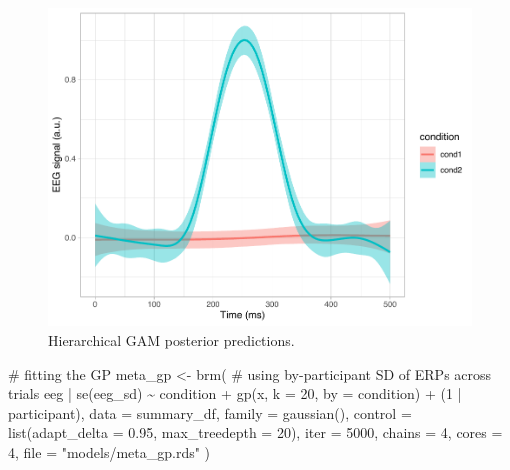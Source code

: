 \documentclass[
  doc,
  floatsintext,
  longtable,
  a4paper,
  nolmodern,
  notxfonts,
  notimes,
  colorlinks=true,linkcolor=blue,citecolor=blue,urlcolor=blue]{apa7}
\newenvironment{Shaded}{\begin{snugshade}}{\end{snugshade}}
\newcommand{\AttributeTok}[1]{\textcolor[rgb]{0.40,0.45,0.13}{#1}}
\newcommand{\CommentTok}[1]{\textcolor[rgb]{0.37,0.37,0.37}{#1}}
\newcommand{\DecValTok}[1]{\textcolor[rgb]{0.68,0.00,0.00}{#1}}
\newcommand{\FloatTok}[1]{\textcolor[rgb]{0.68,0.00,0.00}{#1}}
\newcommand{\FunctionTok}[1]{\textcolor[rgb]{0.28,0.35,0.67}{#1}}
\newcommand{\NormalTok}[1]{\textcolor[rgb]{0.00,0.23,0.31}{#1}}
\newcommand{\OtherTok}[1]{\textcolor[rgb]{0.00,0.23,0.31}{#1}}
\newcommand{\SpecialCharTok}[1]{\textcolor[rgb]{0.37,0.37,0.37}{#1}}
\newcommand{\StringTok}[1]{\textcolor[rgb]{0.13,0.47,0.30}{#1}}
\begin{document}
\begin{figure}[H]

\caption{Hierarchical GAM posterior predictions.}

{\centering \includegraphics[width=1\textwidth,height=\textheight]{brms_meeg_files/figure-pdf/meta-gam-preds-1.pdf}

}

\end{figure}%

\begin{Shaded}
\begin{Highlighting}[]
\CommentTok{\# fitting the GP}
\NormalTok{meta\_gp }\OtherTok{\textless{}{-}} \FunctionTok{brm}\NormalTok{(}
    \CommentTok{\# using by{-}participant SD of ERPs across trials}
\NormalTok{    eeg }\SpecialCharTok{|} \FunctionTok{se}\NormalTok{(eeg\_sd) }\SpecialCharTok{\textasciitilde{}}
\NormalTok{        condition }\SpecialCharTok{+} \FunctionTok{gp}\NormalTok{(x, }\AttributeTok{k =} \DecValTok{20}\NormalTok{, }\AttributeTok{by =}\NormalTok{ condition) }\SpecialCharTok{+}
\NormalTok{        (}\DecValTok{1} \SpecialCharTok{|}\NormalTok{ participant),}
    \AttributeTok{data =}\NormalTok{ summary\_df,}
    \AttributeTok{family =} \FunctionTok{gaussian}\NormalTok{(),}
    \AttributeTok{control =} \FunctionTok{list}\NormalTok{(}\AttributeTok{adapt\_delta =} \FloatTok{0.95}\NormalTok{, }\AttributeTok{max\_treedepth =} \DecValTok{20}\NormalTok{),}
    \AttributeTok{iter =} \DecValTok{5000}\NormalTok{,}
    \AttributeTok{chains =} \DecValTok{4}\NormalTok{,}
    \AttributeTok{cores =} \DecValTok{4}\NormalTok{,}
    \AttributeTok{file =} \StringTok{"models/meta\_gp.rds"}
\NormalTok{    )}
\end{Highlighting}
\end{Shaded}
\end{document}
